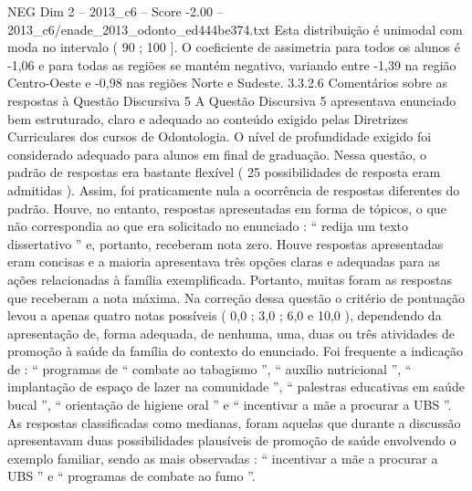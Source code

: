 \begin{textsample}{NEG Dim 2 – 2013\_c6 – Score -2.00 – 2013\_c6/enade\_2013\_odonto\_ed444be374.txt}
Esta distribuição é unimodal com moda no intervalo ( 90 ; 100 ].
O coeficiente de assimetria para todos os alunos é -1,06 e para todas as regiões se mantém negativo, variando entre -1,39 na região Centro-Oeste e -0,98 nas regiões Norte e Sudeste. 3.3.2.6 Comentários sobre as respostas à Questão Discursiva 5 A Questão Discursiva 5 apresentava enunciado bem estruturado, claro e adequado ao conteúdo exigido pelas Diretrizes Curriculares dos cursos de Odontologia.
O nível de profundidade exigido foi considerado adequado para alunos em final de graduação.
Nessa questão, o padrão de respostas era bastante flexível ( 25 possibilidades de resposta eram admitidas ).
Assim, foi praticamente nula a ocorrência de respostas diferentes do padrão.
Houve, no entanto, respostas apresentadas em forma de tópicos, o que não correspondia ao que era solicitado no enunciado : “ redija um texto dissertativo ” e, portanto, receberam nota zero.
Houve respostas apresentadas eram concisas e a maioria apresentava três opções claras e adequadas para as ações relacionadas à família exemplificada.
Portanto, muitas foram as respostas que receberam a nota máxima.
Na correção dessa questão o critério de pontuação levou a apenas quatro notas possíveis ( 0,0 ; 3,0 ; 6,0 e 10,0 ), dependendo da apresentação de, forma adequada, de nenhuma, uma, duas ou três atividades de promoção à saúde da família do contexto do enunciado.
Foi frequente a indicação de : “ programas de “ combate ao tabagismo ”, “ auxílio nutricional ”, “ implantação de espaço de lazer na comunidade ”, “ palestras educativas em saúde bucal ”, “ orientação de higiene oral ” e “ incentivar a mãe a procurar a UBS ”.
As respostas classificadas como medianas, foram aquelas que durante a discussão apresentavam duas possibilidades plausíveis de promoção de saúde envolvendo o exemplo familiar, sendo as mais observadas : “ incentivar a mãe a procurar a UBS ” e “ programas de combate ao fumo ”.

\end{textsample}
